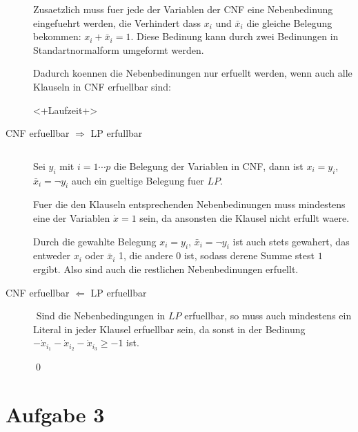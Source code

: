 \begin{description}
Zusaetzlich muss fuer jede der Variablen der CNF eine Nebenbedinung eingefuehrt werden,
die Verhindert dass $x_i$ und $\bar x_i$ die gleiche Belegung bekommen:
$x_i + \bar x_i = 1$. Diese Bedinung kann durch zwei Bedinungen in Standartnormalform umgeformt werden.

Dadurch koennen die Nebenbedinungen nur erfuellt werden, wenn auch alle Klauseln in CNF erfuellbar sind:

<+Laufzeit+>

\item[CNF erfuellbar $\Rightarrow$ LP erfullbar] $ $

Sei $y_i$ mit $i=1 \cdots p$ die Belegung der Variablen in CNF,
dann ist $x_i = y_i$, $\bar x_i = \lnot y_i$ auch ein gueltige Belegung fuer $LP$.

Fuer die den Klauseln entsprechenden Nebenbedinungen muss mindestens eine
der Variablen $\dot x = 1$ sein, da ansonsten die Klausel nicht erfullt waere.

Durch die gewahlte Belegung  $x_i = y_i$, $\bar x_i = \lnot y_i$ ist auch stets gewahert,
das entweder $x_i$ oder $\bar x_i$ 1, die andere 0 ist, sodass derene Summe stest $1$ ergibt.
Also sind auch die restlichen Nebenbedinungen erfuellt.

\item[CNF erfuellbar $\Leftarrow$ LP erfuellbar] $ $
Sind die Nebenbedingungen in $LP$ erfuellbar, so muss auch mindestens ein Literal in jeder 
Klausel erfuellbar sein, da sonst in der Bedinung $-\dot x_{i_1} - \dot x_{i_2} - \dot x_{i_3}\geq -1$
ist.

\qed

\end{description}

\section*{Aufgabe 3}


